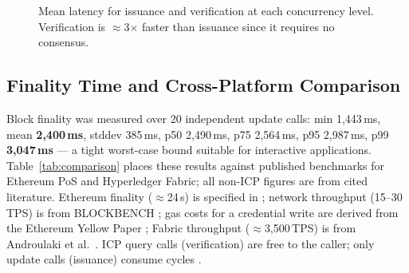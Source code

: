 \documentclass[conference,a4paper]{IEEEtran}
\begin{document}
\begin{figure}[t]
\centering
{}
\caption{Mean latency for issuance and verification at each concurrency level. Verification is $\approx$3$\times$ faster than issuance since it requires no consensus.}
\label{fig:conc_lat}
\end{figure}

\subsection{Finality Time and Cross-Platform Comparison}

Block finality was measured over 20 independent update calls: min 1{,}443\,ms, mean \textbf{2{,}400\,ms}, stddev 385\,ms, p50 2{,}490\,ms, p75 2{,}564\,ms, p95 2{,}987\,ms, p99 \textbf{3{,}047\,ms} — a tight worst-case bound suitable for interactive applications. Table~\ref{tab:comparison} places these results against published benchmarks for Ethereum PoS and Hyperledger Fabric; all non-ICP figures are from cited literature. Ethereum finality ($\approx$24\,s) is specified in \cite{buterin2020eth2}; network throughput (15--30\,TPS) is from BLOCKBENCH \cite{dinh2017blockbench}; gas costs for a credential write are derived from the Ethereum Yellow Paper \cite{wood2014ethereum}; Fabric throughput ($\approx$3,500\,TPS) is from Androulaki et al.\ \cite{androulaki2018fabric}. ICP query calls (verification) are free to the caller; only update calls (issuance) consume cycles \cite{dfinity2022geeks}.
\end{document}
